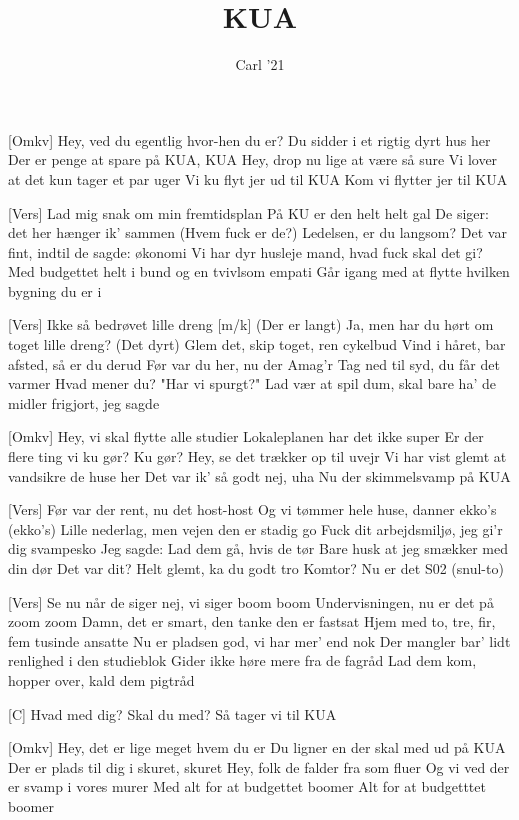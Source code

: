 \documentclass[a4paper,11pt]{article}
\title{KUA}
\author{Carl '21}
\begin{document}
\maketitle

\begin{song}


[Omkv] Hey, ved du egentlig hvor-hen du er?
    Du sidder i et rigtig dyrt hus her
    Der er penge at spare på KUA, KUA
    Hey, drop nu lige at være så sure
    Vi lover at det kun tager et par uger
    Vi ku flyt jer ud til KUA
    Kom vi flytter jer til KUA


[Vers] Lad mig snak om min fremtidsplan
    På KU er den helt helt gal
    De siger: det her hænger ik' sammen
    (Hvem fuck er de?) Ledelsen, er du langsom?
    Det var fint, indtil de sagde: økonomi
    Vi har dyr husleje mand, hvad fuck skal det gi?
    Med budgettet helt i bund og en tvivlsom empati
    Går igang med at flytte hvilken bygning du er i

[Vers] Ikke så bedrøvet lille dreng [m/k] (Der er langt)
    Ja, men har du hørt om toget lille dreng? (Det dyrt)
    Glem det, skip toget, ren cykelbud
    Vind i håret, bar afsted, så er du derud
    Før var du her, nu der Amag'r
    Tag ned til syd, du får det varmer
    Hvad mener du? "Har vi spurgt?"
    Lad vær at spil dum, skal bare ha' de midler frigjort, jeg sagde

[Omkv] Hey, vi skal flytte alle studier
    Lokaleplanen har det ikke super
    Er der flere ting vi ku gør? Ku gør?
    Hey, se det trækker op til uvejr
    Vi har vist glemt at vandsikre de huse her
    Det var ik' så godt nej, uha
    Nu der skimmelsvamp på KUA

[Vers] Før var der rent, nu det host-host
    Og vi tømmer hele huse, danner ekko's (ekko's)
    Lille nederlag, men vejen den er stadig go
    Fuck dit arbejdsmiljø, jeg gi'r dig svampesko
    Jeg sagde: Lad dem gå, hvis de tør
    Bare husk at jeg smækker med din dør
    Det var dit? Helt glemt, ka du godt tro
    Komtor? Nu er det S02 (snul-to)

[Vers] Se nu når de siger nej, vi siger boom boom
    Undervisningen, nu er det på zoom zoom
    Damn, det er smart, den tanke den er fastsat
    Hjem med to, tre, fir, fem tusinde ansatte
    Nu er pladsen god, vi har mer' end nok
    Der mangler bar' lidt renlighed i den studieblok
    Gider ikke høre mere fra de fagråd
    Lad dem kom, hopper over, kald dem pigtråd


[C] Hvad med dig? Skal du med? Så tager vi til KUA

[Omkv] Hey, det er lige meget hvem du er
    Du ligner en der skal med ud på KUA
    Der er plads til dig i skuret, skuret
    Hey, folk de falder fra som fluer
    Og vi ved der er svamp i vores murer
    Med alt for at budgettet boomer
    Alt for at budgetttet boomer
\end{song}
\end{document}
